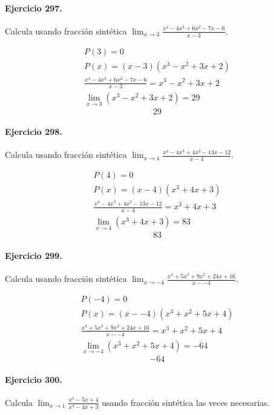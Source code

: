 \documentclass[11pt,a4paper]{article}
\begin{document}
\paragraph{Ejercicio 297.} Calcula usando fracción sintética $\displaystyle\lim_{x\to 3}\frac{x^4 - 4x^3 + 6x^2 - 7x - 6}{x-3}$. 

\[
\begin{aligned}
P(3)=0\\
P(x)=(x-3)(x^3 - x^2 + 3x + 2)\\
\frac{x^4 - 4x^3 + 6x^2 - 7x - 6}{x-3}=x^3 - x^2 + 3x + 2\\
\lim_{x\to 3}(x^3 - x^2 + 3x + 2)=29
\end{aligned}
\]
\[\boxed{29}\]


\paragraph{Ejercicio 298.} Calcula usando fracción sintética $\displaystyle\lim_{x\to 4}\frac{x^4 - 4x^3 + 4x^2 - 13x - 12}{x-4}$. 

\[
\begin{aligned}
P(4)=0\\
P(x)=(x-4)(x^3 + 4x + 3)\\
\frac{x^4 - 4x^3 + 4x^2 - 13x - 12}{x-4}=x^3 + 4x + 3\\
\lim_{x\to 4}(x^3 + 4x + 3)=83
\end{aligned}
\]
\[\boxed{83}\]


\paragraph{Ejercicio 299.} Calcula usando fracción sintética $\displaystyle\lim_{x\to -4}\frac{x^4 + 5x^3 + 9x^2 + 24x + 16}{x--4}$. 

\[
\begin{aligned}
P(-4)=0\\
P(x)=(x--4)(x^3 + x^2 + 5x + 4)\\
\frac{x^4 + 5x^3 + 9x^2 + 24x + 16}{x--4}=x^3 + x^2 + 5x + 4\\
\lim_{x\to -4}(x^3 + x^2 + 5x + 4)=-64
\end{aligned}
\]
\[\boxed{-64}\]


\paragraph{Ejercicio 300.} Calcula $\displaystyle\lim_{x\to1}\frac{x^5-5x+4}{x^4-4x+3}$ usando fracción sintética las veces necesarias.
\end{document}
